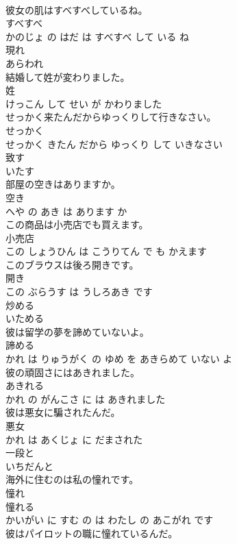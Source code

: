 \documentclass[8pt]{extreport}
\begin{document}
\begin{CJK}{UTF8}{min}
\\	彼女の肌はすべすべしているね。	
\\	すべすべ 
\\	かのじょ の はだ は すべすべ して いる ね			
\\	現れ	
\\	あらわれ			
\\	結婚して姓が変わりました。	
\\	姓 
\\	けっこん して せい が かわりました			
\\	せっかく来たんだからゆっくりして行きなさい。	
\\	せっかく 
\\	せっかく きたん だから ゆっくり して いきなさい			
\\	致す	
\\	いたす			
\\	部屋の空きはありますか。	
\\	空き 
\\	へや の あき は あります か			
\\	この商品は小売店でも買えます。	
\\	小売店 
\\	この しょうひん は こうりてん で も かえます			
\\	このブラウスは後ろ開きです。	
\\	開き 
\\	この ぶらうす は うしろあき です			
\\	炒める	
\\	いためる			
\\	彼は留学の夢を諦めていないよ。	
\\	諦める 
\\	かれ は りゅうがく の ゆめ を あきらめて いない よ			
\\	彼の頑固さにはあきれました。	
\\	あきれる 
\\	かれ の がんこさ に は あきれました			
\\	彼は悪女に騙されたんだ。	
\\	悪女 
\\	かれ は あくじょ に だまされた			
\\	一段と	
\\	いちだんと			
\\	海外に住むのは私の憧れです。	
\\	憧れ 
\\	憧れる 
\\	かいがい に すむ の は わたし の あこがれ です			
\\	彼はパイロットの職に憧れているんだ。	

\end{CJK}
\end{document}
